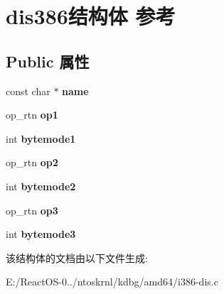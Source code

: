 \hypertarget{structdis386}{}\section{dis386结构体 参考}
\label{structdis386}
\subsection*{Public 属性}
\begin{DoxyCompactItemize}
\item 
\mbox{\label{structdis386_aa6809a9a29d39390dba2a0874055afb6}} 
const char $\ast$ {\bfseries name}
\item 
\mbox{\label{structdis386_a1c44690818883431567c1612826efcaf}} 
op\+\_\+rtn {\bfseries op1}
\item 
\mbox{\label{structdis386_af4c27cf0ee10ea6808e5a698e1db0ad4}} 
int {\bfseries bytemode1}
\item 
\mbox{\label{structdis386_ab0d04763c7bf8a23277254413b82411d}} 
op\+\_\+rtn {\bfseries op2}
\item 
\mbox{\label{structdis386_a44b0936c49754131d2bd8f4dae7d36a1}} 
int {\bfseries bytemode2}
\item 
\mbox{\label{structdis386_a12f8a63de32040e0a96220db838a3ed0}} 
op\+\_\+rtn {\bfseries op3}
\item 
\mbox{\label{structdis386_ad44b25f9c08112d8944851ffbb731fe2}} 
int {\bfseries bytemode3}
\end{DoxyCompactItemize}


该结构体的文档由以下文件生成\+:\begin{DoxyCompactItemize}
\item 
E\+:/\+React\+O\+S-\/0../ntoskrnl/kdbg/amd64/i386-\/dis.\+c\end{DoxyCompactItemize}
